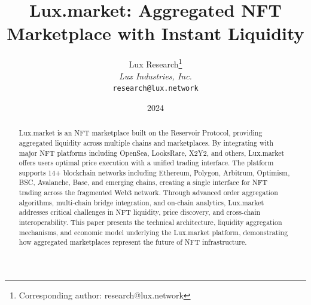 \documentclass[11pt,a4paper]{article}
\title{Lux.market: Aggregated NFT Marketplace with Instant Liquidity}
\author{
Lux Research\thanks{Corresponding author: research@lux.network}\\
\textit{Lux Industries, Inc.}\\
\texttt{research@lux.network}
}
\date{2024}
\begin{document}
\luxcoverpage

\begin{abstract}
Lux.market is an NFT marketplace built on the Reservoir Protocol, providing aggregated liquidity across multiple chains and marketplaces. By integrating with major NFT platforms including OpenSea, LooksRare, X2Y2, and others, Lux.market offers users optimal price execution with a unified trading interface. The platform supports 14+ blockchain networks including Ethereum, Polygon, Arbitrum, Optimism, BSC, Avalanche, Base, and emerging chains, creating a single interface for NFT trading across the fragmented Web3 network. Through advanced order aggregation algorithms, multi-chain bridge integration, and on-chain analytics, Lux.market addresses critical challenges in NFT liquidity, price discovery, and cross-chain interoperability. This paper presents the technical architecture, liquidity aggregation mechanisms, and economic model underlying the Lux.market platform, demonstrating how aggregated marketplaces represent the future of NFT infrastructure.
\end{abstract}















\end{document}
